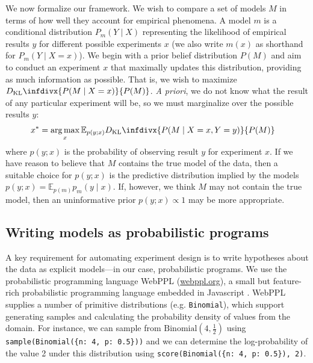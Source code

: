 \documentclass{article}
\newcommand{\dkl}{D_\mathrm{KL}\infdivx}
\DeclareMathOperator*{\argmax}{arg\,max}
\begin{document}
We now formalize our framework.
We wish to compare a set of models $M$ in terms of how well they account for empirical phenomena.
A model $m$ is a conditional distribution $P_m(Y \mid X)$ representing the likelihood of empirical results $y$ for different possible experiments $x$ (we also write $m(x)$ as shorthand for $P_m(Y \mid X = x)$).
We begin with a prior belief distribution $P(M)$ and aim to conduct an experiment $x$ that maximally updates this distribution, providing as much information as possible.
That is, we wish to maximize $\dkl{ P(M \mid X = x) }{ P(M) }$.
\emph{A priori}, we do not know what the result of any particular experiment will be, so we must marginalize over the possible results $y$:
\begin{align}
  x^{*} &= \argmax_{x} {\mathbb E}_{p(y ; x)} \dkl{ P(M \mid X = x, Y = y) }{ P(M) }  \label{eq:oed}
\end{align}
where $p(y ; x)$ is the probability of observing result $y$ for experiment $x$.
If we have reason to believe that $M$ contains the true model of the data, then a suitable choice for $p(y ; x)$ is the predictive distribution implied by the models $p(y ; x) = {\mathbb E}_{p(m)} p_m(y \mid x)$.
If, however, we think $M$ may not contain the true model, then an uninformative prior $p(y ; x) \propto 1$ may be more appropriate.

\subsection{Writing models as probabilistic programs}

A key requirement for automating experiment design is to write hypotheses about the data as explicit models---in our case, probabilistic programs.
We use the probabilistic programming language WebPPL (\url{webppl.org}), a small but feature-rich probabilistic programming language embedded in Javascript \cite{dippl}.
WebPPL supplies a number of primitive distributions (e.g. \lstinline{Binomial}), which support generating samples and calculating the probability density of values from the domain.
For instance, we can sample from $\text{Binomial}(4, \frac{1}{2})$ using \lstinline|sample(Binomial({n: 4, p: 0.5}))| and we can determine the log-probability of the value 2 under this distribution using \lstinline|score(Binomial({n: 4, p: 0.5}), 2)|.
\end{document}
